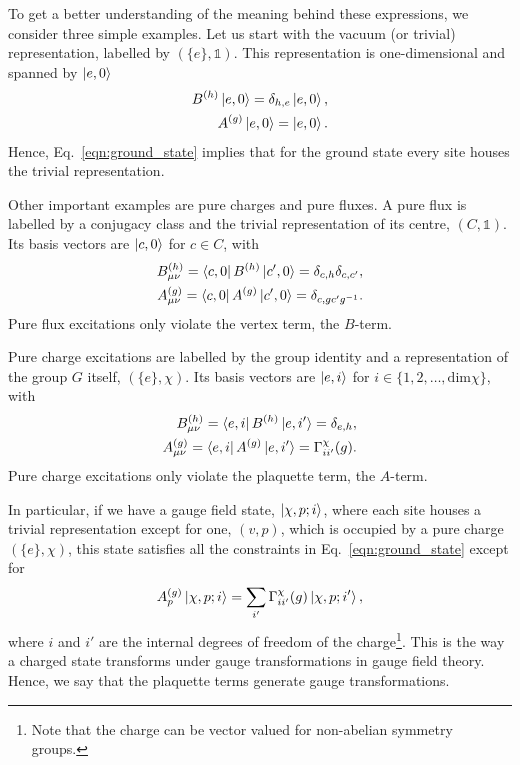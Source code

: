 \documentclass[two column]{article}
\begin{document}
To get a better understanding of the meaning behind these expressions, we consider three simple examples. Let us start with the vacuum (or trivial) representation, labelled by $(\{e\}, \mathbb{1})$. This representation is one-dimensional and spanned by $\ket{e, 0}$
\begin{equation}
    \begin{split}
        B^{(h)}\ket{e, 0} = \delta_{h,e}\ket{e, 0},\\
        A^{(g)}\ket{e, 0} = \ket{e,0}.
    \end{split}
\end{equation}
Hence, Eq.~\eqref{eqn:ground_state} implies that for the ground state every site houses the trivial representation.

Other important examples are pure charges and pure fluxes. A pure flux is labelled by a conjugacy class and the trivial representation of its centre, $(C, \mathbb{1})$. Its basis vectors are $\ket{c, 0}$ for $c \in C$, with
\begin{equation}
    \begin{split}
        B^{(h)}_{\mu\nu}=\bra{c, 0} B^{(h)} \ket{c', 0} = \delta_{c, h} \delta_{c, c'}, \\
        A^{(g)}_{\mu\nu} = \bra{c, 0} A^{(g)} \ket{c', 0} = \delta_{c,gc'g^{-1}}.
    \end{split}
\end{equation}
Pure flux excitations only violate the vertex term, the $B$-term.

Pure charge excitations are labelled by the group identity and a representation of the group $G$ itself, $(\{e\}, \chi)$. Its basis vectors are $\ket{e, i}$ for $i \in \{1, 2, \ldots, \text{dim}\chi\}$, with
\begin{equation}
    \begin{split}
        B^{(h)}_{\mu\nu}=\bra{e, i} B^{(h)} \ket{e, i'} = \delta_{e, h},\\
        A^{(g)}_{\mu\nu} = \bra{e, i} A^{(g)} \ket{e, i'} = \Gamma^\chi_{ii'}(g).
    \end{split}
\end{equation}
Pure charge excitations only violate the plaquette term, the $A$-term.


In particular, if we have a gauge field state, $\ket{\chi, p; i}$, where each site houses a trivial representation except for one, $(v, p)$, which is occupied by a pure charge $(\{e\}, \chi)$, this state satisfies all the constraints in Eq.~\eqref{eqn:ground_state} except for
\begin{equation}
    A_p^{(g)}\ket{\chi, p; i} = \sum_{i'} \Gamma^\chi_{ii'}(g)\ket{\chi, p; i'},\label{eqn:tranfs}
\end{equation}
where $i$ and $i'$ are the internal degrees of freedom of the charge\footnote{Note that the charge can be vector valued for non-abelian symmetry groups.}.
This is the way a charged state transforms under gauge transformations in gauge field theory. Hence, we say that the plaquette terms generate gauge transformations.
\end{document}
